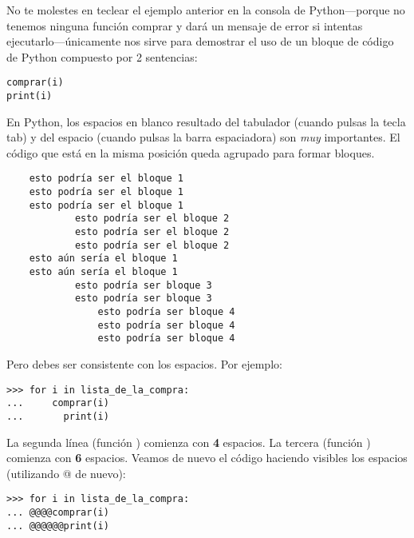 No te molestes en teclear el ejemplo anterior en la consola de Python---porque no tenemos ninguna función comprar y dará un mensaje de error si intentas ejecutarlo---únicamente nos sirve para demostrar el uso de un bloque de código de Python compuesto por 2 sentencias:

\begin{listingignore}
\begin{verbatim}
comprar(i)
print(i)
\end{verbatim}
\end{listingignore}

En Python, los espacios en blanco resultado del tabulador (cuando pulsas la tecla tab) y del espacio (cuando pulsas la barra espaciadora) son \emph{muy} importantes.  El código que está en la misma posición queda agrupado para formar bloques.

\begin{listing}
\begin{verbatim}
    esto podría ser el bloque 1
    esto podría ser el bloque 1
    esto podría ser el bloque 1
	        esto podría ser el bloque 2
	        esto podría ser el bloque 2
	        esto podría ser el bloque 2
    esto aún sería el bloque 1
    esto aún sería el bloque 1
	        esto podría ser bloque 3
	        esto podría ser bloque 3
	            esto podría ser bloque 4
	            esto podría ser bloque 4
	            esto podría ser bloque 4
\end{verbatim}
\end{listing}

Pero debes ser consistente con los espacios.  Por ejemplo:

\begin{listingignore}
\begin{verbatim}
>>> for i in lista_de_la_compra:
...     comprar(i)
...       print(i)
\end{verbatim}
\end{listingignore}

La segunda línea (función ) comienza con \textbf{4} espacios.  La tercera (función ) comienza con \textbf{6} espacios.  Veamos de nuevo el código haciendo visibles los espacios (utilizando @ de nuevo):

\begin{listingignore}
\begin{verbatim}
>>> for i in lista_de_la_compra:
... @@@@comprar(i)
... @@@@@@print(i)
\end{verbatim}
\end{listingignore}

